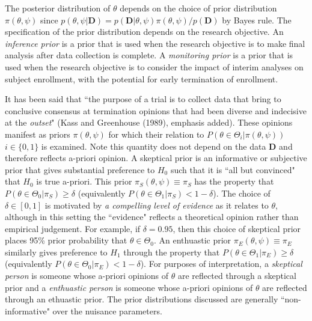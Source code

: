 \documentclass[12pt]{article}
\begin{document}
The posterior distribution of $\theta$ depends on the choice of prior distribution $\pi(\theta,\psi)$ since $p(\theta,\psi|\mathbf{D})=p(\mathbf{D}|\theta,\psi)\pi(\theta,\psi)/p(\mathbf{D})$ by Bayes rule. The specification of the prior distribution depends on the research objective. An \textit{inference prior} is a prior that is used when the research objective is to make final analysis after data collection is complete. A \textit{monitoring prior} is a prior that is used when the research objective is to consider the impact of interim analyses on subject enrollment, with the potential for early termination of enrollment.

It has been said that ``the purpose of a trial is to collect data that bring to conclusive consensus at termination opinions that had been diverse and indecisive at the \textit{outset}" (Kass and Greenhouse (1989), emphasis added). These opinions manifest as priors $\pi(\theta,\psi)$ for which their relation to $P(\theta\in\Theta_i|\pi(\theta,\psi))$ $i\in\{0,1\}$ is examined. Note this quantity does not depend on the data $\mathbf{D}$ and therefore reflects a-priori opinion. A skeptical prior is an informative or subjective prior that gives substantial preference to $H_0$ such that it is ``all but convinced" that $H_0$ is true a-priori. This prior $\pi_{S}(\theta,\psi)\equiv\pi_{S}$ has the property that $P(\theta\in\Theta_0| \pi_{S})\geq\delta$ (equivalently $P(\theta\in\Theta_1| \pi_{S})<1-\delta$). The choice of $\delta\in[0,1]$ is motivated by \textit{a compelling level of evidence} as it relates to $\theta$, although in this setting the ``evidence" reflects a theoretical opinion rather than empirical judgement. For example, if $\delta=0.95$, then this choice of skeptical prior places 95\% prior probability that $\theta\in\Theta_0$. An enthuastic prior $\pi_{E}(\theta,\psi)\equiv\pi_{E}$ similarly gives preference to $H_1$ through the property that $P(\theta\in\Theta_1| \pi_{E})\geq\delta$ (equivalently $P(\theta\in\Theta_0| \pi_{E})<1-\delta$). For purposes of interpretation, a \textit{skeptical person} is someone whose a-priori opinions of $\theta$ are reflected through a skeptical prior and a \textit{enthuastic person} is someone whose a-priori opinions of $\theta$ are reflected through an ethuastic prior. The prior distributions discussed are generally ``non-informative" over the nuisance parameters.
\end{document}
